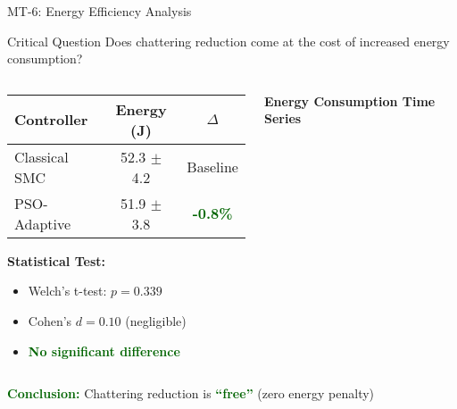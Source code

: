 \documentclass[10pt,aspectratio=169]{beamer}
\newcommand{\emphgreen}[1]{\textcolor{darkgreen}{\textbf{#1}}}
\begin{document}
\begin{frame}{MT-6: Energy Efficiency Analysis}
\begin{block}{Critical Question}
Does chattering reduction come at the cost of increased energy consumption?
\end{block}

\vspace{0.3cm}
\begin{columns}
\begin{column}{0.5\textwidth}
\begin{table}
\small
\begin{tabular}{lcc}
\toprule
\textbf{Controller} & \textbf{Energy (J)} & \textbf{$\Delta$} \\
\midrule
Classical SMC & 52.3 $\pm$ 4.2 & Baseline \\
PSO-Adaptive & 51.9 $\pm$ 3.8 & \emphgreen{-0.8\%} \\
\bottomrule
\end{tabular}
\end{table}

\vspace{0.3cm}
\textbf{Statistical Test:}
\begin{itemize}
    \item Welch's t-test: $p = 0.339$
    \item Cohen's $d = 0.10$ (negligible)
    \item \emphgreen{No significant difference}
\end{itemize}
\end{column}
\begin{column}{0.5\textwidth}
\begin{center}
\textbf{Energy Consumption Time Series}
\end{center}
\end{column}
\end{columns}

\vspace{0.3cm}
\centering
\emphgreen{Conclusion:} Chattering reduction is \emphgreen{``free''} (zero energy penalty)
\end{frame}
\end{document}
